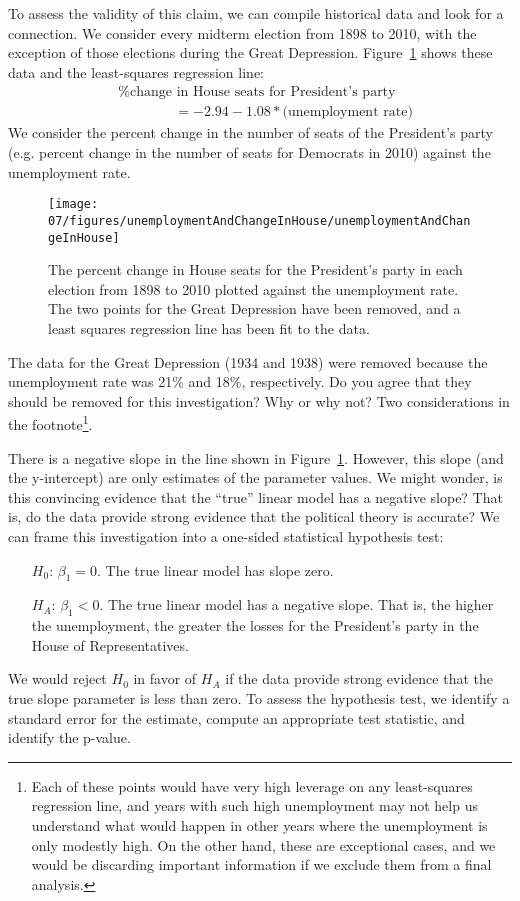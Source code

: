 To assess the validity of this claim, we can compile historical data and look for a connection. We consider every midterm election from 1898 to 2010, with the exception of those elections during the Great Depression. Figure~\ref{unemploymentAndChangeInHouse} shows these data and the least-squares regression line:
\begin{align*}
&\text{\% change in House seats for President's party}  \\
&\qquad\qquad= -2.94 - 1.08*\text{(unemployment rate)}
\end{align*}
We consider the percent change in the number of seats of the President's party (e.g. percent change in the number of seats for Democrats in 2010) against the unemployment rate.
\begin{figure}
\centering
\texttt{[image: 07/figures/unemploymentAndChangeInHouse/unemploymentAndChangeInHouse]}
\caption{The percent change in House seats for the President's party in each election from 1898 to 2010 plotted against the unemployment rate. The two points for the Great Depression have been removed, and a least squares regression line has been fit to the data.}
\label{unemploymentAndChangeInHouse}
\end{figure}

\begin{exercise}
The data for the Great Depression (1934 and 1938) were removed because the unemployment rate was 21\% and 18\%, respectively. Do you agree that they should be removed for this investigation? Why or why not? Two considerations in the footnote\footnote{Each of these points would have very high leverage on any least-squares regression line, and years with such high unemployment may not help us understand what would happen in other years where the unemployment is only modestly high. On the other hand, these are exceptional cases, and we would be discarding important information if we exclude them from a final analysis.}.
\end{exercise}

There is a negative slope in the line shown in Figure~\ref{unemploymentAndChangeInHouse}. However, this slope (and the y-intercept) are only estimates of the parameter values. We might wonder, is this convincing evidence that the ``true'' linear model has a negative slope? That is, do the data provide strong evidence that the political theory is accurate? We can frame this investigation into a one-sided statistical hypothesis test:
\begin{itemize}
\item[$H_0$:] $\beta_1 = 0$. The true linear model has slope zero.
\item[$H_A$:] $\beta_1 < 0$. The true linear model has a negative slope. That is, the higher the unemployment, the greater the losses for the President's party in the House of Representatives.
\end{itemize}
We would reject $H_0$ in favor of $H_A$ if the data provide strong evidence that the true slope parameter is less than zero. To assess the hypothesis test, we identify a standard error for the estimate, compute an appropriate test statistic, and identify the p-value.

